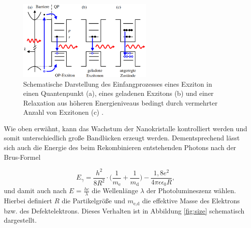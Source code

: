 \begin{figure}[hbtp]
	\centering
	\includegraphics[width=0.6\textwidth]{Abb/photoqp.png}
	\caption{Schematische Darstellung des Einfangprozesses eines Exziton in einen
	Quantenpunkt (a), eines geladenen Exzitons (b) und einer Relaxation
	aus höheren Energieniveaus bedingt durch vermehrter Anzahl von Exzitonen (c) \cite{lars}.}
	\label{fig:photoqp}
\end{figure}
\noindent
Wie oben erwähnt, kann das Wachstum der Nanokristalle kontrolliert werden und
somit unterschiedlich große Bandlücken erzeugt werden. Dementsprechend lässt
sich auch die Energie des beim Rekombinieren entstehenden Photons nach der Brus-Formel
\cite{brus}

\begin{equation}
	E_{\gamma} = \frac{h^2}{8R^2}\cdot \biggl(\frac{1}{m_{\text{e}}} + \frac{1}{m_{\text{d}}} \biggr)
								- \frac{1,8e^2}{4\pi\epsilon\epsilon_0 R},
	\label{F1}
\end{equation}
\noindent
und damit auch nach $E$ = $\frac{hc}{\lambda}$ die Wellenlänge $\lambda$ der
Photolumineszenz wählen. Hierbei definiert $R$ die Partikelgröße und
$m_{\text{e,d}}$ die effektive Masse des Elektrons bzw. des Defektelektrons.
Dieses Verhalten ist in Abbildung \ref{fig:size} schematisch dargestellt.

